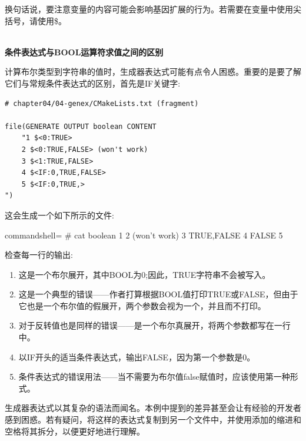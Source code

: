 换句话说，要注意变量的内容可能会影响基因扩展的行为。若需要在变量中使用尖括号，请使用\$<ANGLE-R>。

\hspace*{\fill} \\ %
\noindent
\textbf{条件表达式与BOOL运算符求值之间的区别}

计算布尔类型到字符串的值时，生成器表达式可能有点令人困惑。重要的是要了解它们与常规条件表达式的区别，首先是IF关键字:

\begin{lstlisting}[style=styleCMake]
# chapter04/04-genex/CMakeLists.txt (fragment)

file(GENERATE OUTPUT boolean CONTENT
	"1 $<0:TRUE>
	2 $<0:TRUE,FALSE> (won't work)
	3 $<1:TRUE,FALSE>
	4 $<IF:0,TRUE,FALSE>
	5 $<IF:0,TRUE,>
")
\end{lstlisting}

这会生成一个如下所示的文件:

\begin{tcblisting}{commandshell={}}
# cat boolean
1
  2 (won't work)
  3 TRUE,FALSE 
  4 FALSE
  5
\end{tcblisting}

检查每一行的输出:

\begin{enumerate}
\item 
这是一个布尔展开，其中BOOL为0;因此，TRUE字符串不会被写入。

\item 
这是一个典型的错误——作者打算根据BOOL值打印TRUE或FALSE，但由于它也是一个布尔值的假展开，两个参数会视为一个，并且而不打印。

\item 
对于反转值也是同样的错误——是一个布尔真展开，将两个参数都写在一行中。

\item 
以IF开头的适当条件表达式，输出FALSE，因为第一个参数是0。

\item 
条件表达式的错误用法——当不需要为布尔值false赋值时，应该使用第一种形式。
\end{enumerate}

生成器表达式以其复杂的语法而闻名。本例中提到的差异甚至会让有经验的开发者感到困惑。若有疑问，将这样的表达式复制到另一个文件中，并使用添加的缩进和空格将其拆分，以便更好地进行理解。











